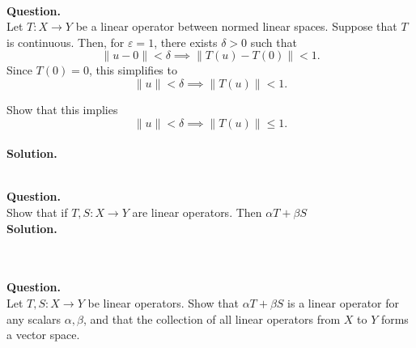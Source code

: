 \documentclass{article}
\begin{document}
\hfill \break  $~\!\!$ \dotfill \medskip \\
\textbf{Question.}\\
Let $T: X \to Y$ be a linear operator between normed linear spaces. Suppose that $T$ is continuous. Then, for $\varepsilon = 1$, there exists $\delta > 0$ such that
\[
\|u - 0\| < \delta \implies \|T(u) - T(0)\| < 1.
\]
Since $T(0) = 0$, this simplifies to
\[
\|u\| < \delta \implies \|T(u)\| < 1.
\]

Show that this implies
\[
\|u\| < \delta \implies \|T(u)\| \le 1.
\]
\noindent\\
\textbf{Solution.}\\
\quad\\
\noindent{}


\textbf{Question.}\\
Show that if $T, S: X\rightarrow Y$ are linear operators. Then $\alpha T + \beta S$
\noindent\\
\textbf{Solution.}\\
\quad\\
\noindent\fbox{ \parbox{\textwidth}{

}}

\hfill \break  $~\!\!$ \dotfill \medskip \\
\textbf{Question.}\\
Let $T, S : X \to Y$ be linear operators. Show that $\alpha T + \beta S$ is a linear operator for any scalars $\alpha, \beta$, and that the collection of all linear operators from $X$ to $Y$ forms a vector space.
\end{document}
